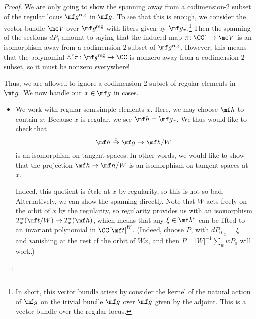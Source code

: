 \documentclass[../notes.tex]{subfiles}
\begin{document}
\begin{proof}
	We are only going to show the spanning away from a codimension-$2$ subset of the regular locus $\mf g^{\mathrm{reg}}$ in $\mf g$. To see that this is enough, we consider the vector bundle $\mc V$ over $\mf g^{\mathrm{reg}}$ with fibers given by $\mf g_x$.\footnote{In short, this vector bundle arises by consider the kernel of the natural action of $\mf g$ on the trivial bundle $\mf g$ over $\mf g$ given by the adjoint. This is a vector bundle over the regular locus.} Then the spanning of the sections $dP_i$ amount to saying that the induced map $\pi\colon\CC^r\to\mc V$ is an isomorphism away from a codimension-$2$ subset of $\mf g^{\mathrm{reg}}$. However, this means that the polynomial $\land^r\pi\colon\mf g^{\mathrm{reg}}\to\CC$ is nonzero away from a codimension-$2$ subset, so it must be nonzero everywhere!
	
	Thus, we are allowed to ignore a codimension-$2$ subset of regular elements in $\mf g$. We now handle our $x\in\mf g$ in cases.
	\begin{itemize}
		\item We work with regular semisimple elements $x$. Here, we may choose $\mf h$ to contain $x$. Because $x$ is regular, we see $\mf h=\mf g_x$. We thus would like to check that
		\[\mf h\stackrel x\to\mf g\to\mf h/W\]
		is an isomorphism on tangent spaces. In other words, we would like to show that the projection $\mf h\to\mf h/W$ is an isomorphism on tangent spaces at $x$.
		
		Indeed, this quotient is \'etale at $x$ by regularity, so this is not so bad. Alternatively, we can show the spanning directly. Note that $W$ acts freely on the orbit of $x$ by the regularity, so regularity provides us with an isomorphism $T^*_x(\mf t/W)\to T^*_x(\mf h)$, which means that any $\xi\in\mf h^*$ can be lifted to an invariant polynomial in $\CC[\mf t]^W$. (Indeed, choose $P_0$ with $dP_0|_x=\xi$ and vanishing at the rest of the orbit of $Wx$, and then $P=\left|W\right|^{-1}\sum_wwP_0$ will work.)


\end{itemize}
\end{proof}
\end{document}
